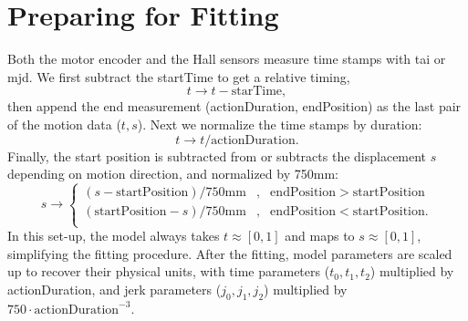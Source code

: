 \documentclass[OPS,lsstdraft,authoryear,toc]{lsstdoc}
\newcommand{\eq}[1]{\begin{equation}#1\end{equation}}
\newcommand{\ead}[1]{\begin{aligned}#1\end{aligned}}
\begin{document}
\section{Preparing for Fitting}
Both the motor encoder and the Hall sensors measure time stamps with tai or mjd.  We first subtract the startTime to get a relative timing,
\begin{equation}
    t \to t - \mathrm{starTime},
\end{equation}
then append the end measurement (actionDuration, endPosition) as the last pair of the motion data ($t, s$). Next we normalize the time stamps by duration:
\eq{
    t \to t/\mathrm{actionDuration}.
}
Finally, the start position is subtracted from or subtracts the displacement $s$ depending on motion direction, and normalized by 750mm:
\eq{
	s \to 
	\left\{ \ead{ 
			(s - \mathrm{startPosition})/750 \mathrm{mm} &, & \mathrm{endPosition} > \mathrm{startPosition}  \\
			(\mathrm{startPosition} - s)/750 \mathrm{mm} &, & \mathrm{endPosition} < \mathrm{startPosition}.  \\
}
\right.
}
In this set-up, the model always takes $t \approx [0,1]$ and maps to $s \approx [0,1]$, simplifying the fitting procedure. After the fitting, model parameters are scaled up to recover their physical units, with time parameters ($t_0, t_1, t_2$) multiplied by actionDuration, and jerk parameters ($j_0, j_1, j_2$) multiplied by $750 \cdot \mathrm{actionDuration}^{-3}$.
\end{document}
